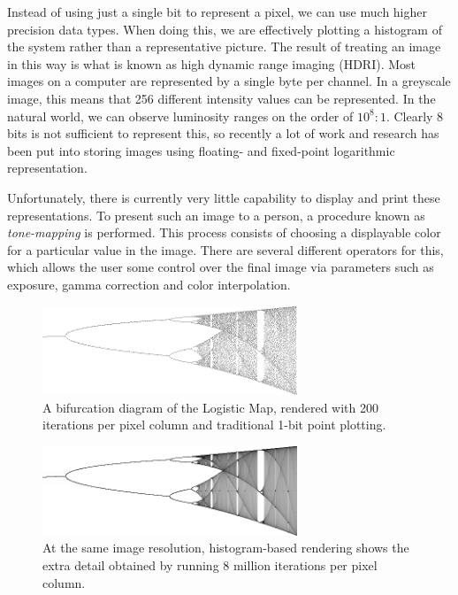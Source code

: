 \documentclass[letterpaper, 11pt]{article}
\begin{document}
Instead of using just a single bit to represent a pixel, we can use much higher precision
data types.  When doing this, we are effectively plotting a histogram of the system rather
than a representative picture. The result of treating an image in this way is what is known
as high dynamic range imaging (HDRI).  Most images on a computer are represented by a single
byte per channel.  In a greyscale image, this means that 256 different intensity values
can be represented.  In the natural world, we can observe luminosity ranges on the order of
$10^8:1$.  Clearly 8 bits is not sufficient to represent this, so recently a lot of work
and research has been put into storing images using floating- and fixed-point logarithmic
representation.

Unfortunately, there is currently very little capability to display and print these
representations.  To present such an image to a person, a procedure known as
\emph{tone-mapping} is performed.  This process consists of choosing a displayable color for
a particular value in the image.  There are several different operators for this, which
allows the user some control over the final image via parameters such as exposure, gamma
correction and color interpolation.

\begin{subfigures}
\label{logistic}

\begin{figure}[htb]
\centering
\includegraphics[width=3in]{figures/logistic-traditional-200.png}
\caption{A bifurcation diagram of the Logistic Map, rendered with 200 iterations per pixel column and traditional 1-bit point plotting.}
\end{figure}

\begin{figure}[htb]
\centering
\includegraphics[width=3in]{figures/logistic-histogram-8m.png}
\caption{At the same image resolution, histogram-based rendering shows the extra detail obtained by running 8 million iterations per pixel column.}
\end{figure}

\end{subfigures}
\end{document}
